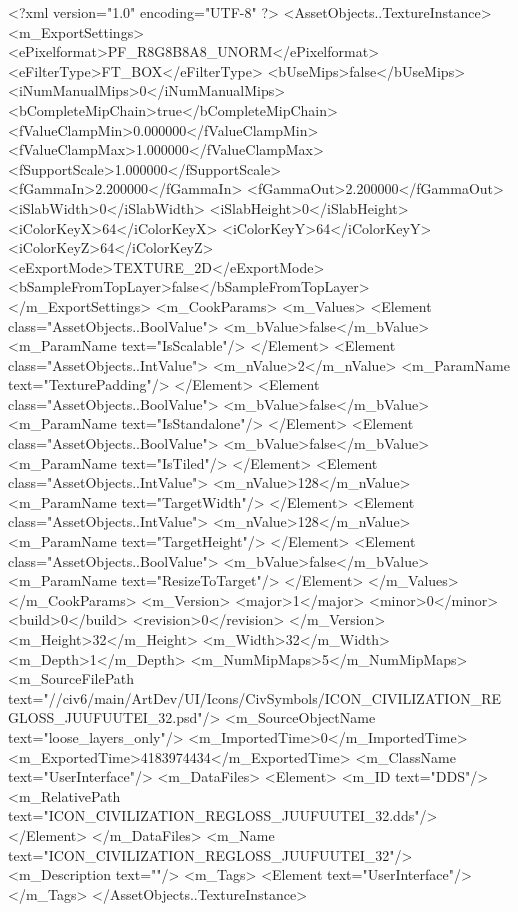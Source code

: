 <?xml version="1.0" encoding="UTF-8" ?>
<AssetObjects..TextureInstance>
	<m_ExportSettings>
		<ePixelformat>PF_R8G8B8A8_UNORM</ePixelformat>
		<eFilterType>FT_BOX</eFilterType>
		<bUseMips>false</bUseMips>
		<iNumManualMips>0</iNumManualMips>
		<bCompleteMipChain>true</bCompleteMipChain>
		<fValueClampMin>0.000000</fValueClampMin>
		<fValueClampMax>1.000000</fValueClampMax>
		<fSupportScale>1.000000</fSupportScale>
		<fGammaIn>2.200000</fGammaIn>
		<fGammaOut>2.200000</fGammaOut>
		<iSlabWidth>0</iSlabWidth>
		<iSlabHeight>0</iSlabHeight>
		<iColorKeyX>64</iColorKeyX>
		<iColorKeyY>64</iColorKeyY>
		<iColorKeyZ>64</iColorKeyZ>
		<eExportMode>TEXTURE_2D</eExportMode>
		<bSampleFromTopLayer>false</bSampleFromTopLayer>
	</m_ExportSettings>
	<m_CookParams>
		<m_Values>
			<Element class="AssetObjects..BoolValue">
				<m_bValue>false</m_bValue>
				<m_ParamName text="IsScalable"/>
			</Element>
			<Element class="AssetObjects..IntValue">
				<m_nValue>2</m_nValue>
				<m_ParamName text="TexturePadding"/>
			</Element>
			<Element class="AssetObjects..BoolValue">
				<m_bValue>false</m_bValue>
				<m_ParamName text="IsStandalone"/>
			</Element>
			<Element class="AssetObjects..BoolValue">
				<m_bValue>false</m_bValue>
				<m_ParamName text="IsTiled"/>
			</Element>
			<Element class="AssetObjects..IntValue">
				<m_nValue>128</m_nValue>
				<m_ParamName text="TargetWidth"/>
			</Element>
			<Element class="AssetObjects..IntValue">
				<m_nValue>128</m_nValue>
				<m_ParamName text="TargetHeight"/>
			</Element>
			<Element class="AssetObjects..BoolValue">
				<m_bValue>false</m_bValue>
				<m_ParamName text="ResizeToTarget"/>
			</Element>
		</m_Values>
	</m_CookParams>
	<m_Version>
		<major>1</major>
		<minor>0</minor>
		<build>0</build>
		<revision>0</revision>
	</m_Version>
	<m_Height>32</m_Height>
	<m_Width>32</m_Width>
	<m_Depth>1</m_Depth>
	<m_NumMipMaps>5</m_NumMipMaps>
	<m_SourceFilePath text="//civ6/main/ArtDev/UI/Icons/CivSymbols/ICON_CIVILIZATION_REGLOSS_JUUFUUTEI_32.psd"/>
	<m_SourceObjectName text="loose_layers_only"/>
	<m_ImportedTime>0</m_ImportedTime>
	<m_ExportedTime>4183974434</m_ExportedTime>
	<m_ClassName text="UserInterface"/>
	<m_DataFiles>
		<Element>
			<m_ID text="DDS"/>
			<m_RelativePath text="ICON_CIVILIZATION_REGLOSS_JUUFUUTEI_32.dds"/>
		</Element>
	</m_DataFiles>
	<m_Name text="ICON_CIVILIZATION_REGLOSS_JUUFUUTEI_32"/>
	<m_Description text=""/>
	<m_Tags>
		<Element text="UserInterface"/>
	</m_Tags>
</AssetObjects..TextureInstance>

